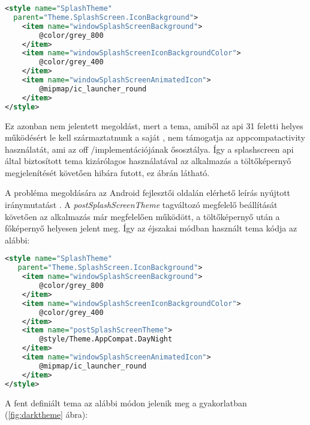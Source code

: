 \begin{lstlisting}[frame=single,language=xml,emph={style,item},
    emphstyle=\color{BurntOrange}\textbf,stringstyle=\color{OliveGreen}\textbf]
<style name="SplashTheme"
  parent="Theme.SplashScreen.IconBackground">
    <item name="windowSplashScreenBackground">
        @color/grey_800
    </item>
    <item name="windowSplashScreenIconBackgroundColor">
        @color/grey_400
    </item>
    <item name="windowSplashScreenAnimatedIcon">
        @mipmap/ic_launcher_round
    </item>
</style>
\end{lstlisting}

Ez azonban nem jelentett megoldást, mert a \gls{tema}, amiből az \acrshort{api} 31 feletti helyes működésért
le kell származtatnunk a saját , nem támogatja az \gls{appcompat}\gls{activity} használatát, ami
az \acrlong{off} \-/implementációjának ősosztálya. Így a \gls{splashscreen} \acrshort{api} által biztosított
\gls{tema} kizárólagos használatával az alkalmazás a töltőképernyő megjelenítését követően hibára futott,
ez \az{\ref{fig:appcompatcrash}} ábrán látható.

A probléma megoldására az Android fejlesztői oldalán elérhető leírás
nyújtott iránymutatást \cite{splashscreenmigration}. A \textit{postSplashScreenTheme} tagváltozó megfelelő beállítását követően
az alkalmazás már megfelelően működött, a töltőképernyő után a főképernyő helyesen jelent meg.
Így az éjszakai módban használt \gls{tema} kódja az alábbi:

\begin{lstlisting}[frame=single,language=xml,emph={style,item},
    emphstyle=\color{BurntOrange}\textbf,stringstyle=\color{OliveGreen}\textbf]
 <style name="SplashTheme"
   parent="Theme.SplashScreen.IconBackground">
    <item name="windowSplashScreenBackground">
        @color/grey_800
    </item>
    <item name="windowSplashScreenIconBackgroundColor">
        @color/grey_400
    </item>
    <item name="postSplashScreenTheme">
        @style/Theme.AppCompat.DayNight
    </item>
    <item name="windowSplashScreenAnimatedIcon">
        @mipmap/ic_launcher_round
    </item>
</style>
\end{lstlisting}

A fent definiált \gls{tema} az alábbi módon jelenik meg a gyakorlatban (\ref{fig:darktheme} ábra):


